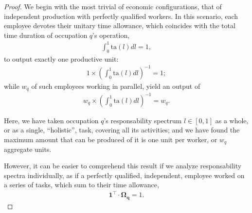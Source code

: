 \documentclass[hidelinks, nonatbib]{elsarticle}
\begin{document}
\begin{lemma}
    \begin{proof}
        We begin with the most trivial of economic configurations, that of independent production with perfectly qualified workers. In this scenario, each employee devotes their unitary time allowance, which coincides with the total time duration of occupation $q$'s operation,
        \begin{gather}
            \int_{0}^{1}{
                \text{ta}(l)
                dl
            }
            =
            1
            ,
        \end{gather}
        to output exactly one productive unit:
        \begin{gather}
            1
            \times
            \left(
                \int_{0}^{1}{
                    \text{ta}(l)dl
                }
            \right) ^ {-1}
            =
            1
            ;
        \end{gather}
        while $w_q$ of such employees working in parallel, yield an output of
        \begin{align}
            w_q 
            \times 
            \left(
                \int_{0}^{1}{
                    \text{ta}(l)dl
                }
            \right) ^ {-1}
            =
            w_q
            .
        \end{align}
        
        Here, we have taken occupation $q$'s responsability spectrum $l \in [0,1]$ as a whole, or as a single, ``holistic'', task, covering all its activities; and we have found the maximum amount that can be produced of it is one unit per worker, or $w_q$ aggregate units.
        
        However, it can be easier to comprehend this result if we analyze responsability spectra individually, as if a perfectly qualified, independent, employee worked on a series of tasks, which sum to their time allowance,
        \begin{gather}
            \boldsymbol{1} ^ {\top}
            \cdot
            \boldsymbol{\Omega_{q}}
            = 
            1
            .
        \end{gather}
        

\end{proof}
\end{lemma}
\end{document}
